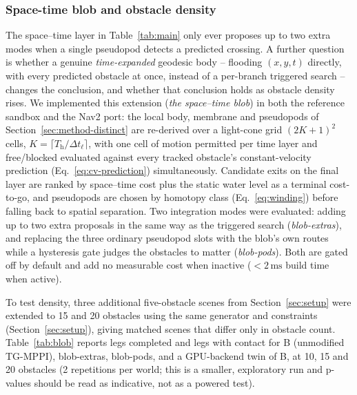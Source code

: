 \documentclass[journal]{IEEEtran}
\begin{document}
\subsubsection{Space-time blob and obstacle density}
\label{sec:blob-density}
The space--time layer in Table~\ref{tab:main} only ever proposes up to two
extra modes when a single pseudopod detects a predicted crossing. A further
question is whether a genuine \emph{time-expanded} geodesic body --
flooding $(x,y,t)$ directly, with every predicted obstacle at once, instead
of a per-branch triggered search -- changes the conclusion, and whether that
conclusion holds as obstacle density rises. We implemented this extension
(\emph{the space--time blob}) in both the reference sandbox and the Nav2
port: the local body, membrane and pseudopods of
Section~\ref{sec:method-distinct} are re-derived over a light-cone grid
$(2K{+}1)^2$ cells, $K=\lceil T_{\mathrm{h}}/\Delta t_\ell\rceil$, with one
cell of motion permitted per time layer and free\-/blocked evaluated against
every tracked obstacle's constant-velocity prediction
(Eq.~\ref{eq:cv-prediction}) simultaneously. Candidate exits on the final
layer are ranked by space--time cost plus the static water level as a
terminal cost-to-go, and pseudopods are chosen by homotopy class
(Eq.~\ref{eq:winding}) before falling back to spatial separation. Two
integration modes were evaluated: adding up to two extra proposals in the
same way as the triggered search (\emph{blob-extras}), and replacing the
three ordinary pseudopod slots with the blob's own routes while a hysteresis
gate judges the obstacles to matter (\emph{blob-pods}). Both are gated off
by default and add no measurable cost when inactive ($<2\,\mathrm{ms}$ build
time when active).

To test density, three additional five-obstacle scenes from
Section~\ref{sec:setup} were extended to 15 and 20 obstacles
using the same generator and constraints (Section~\ref{sec:setup}),
giving matched scenes that differ only in obstacle count. Table~\ref{tab:blob}
reports legs completed and legs with contact for B (unmodified TG-MPPI),
blob-extras, blob-pods, and a GPU-backend twin of B, at 10, 15 and 20
obstacles (2 repetitions per world; this is a smaller, exploratory run and
p-values should be read as indicative, not as a powered test).
\end{document}
